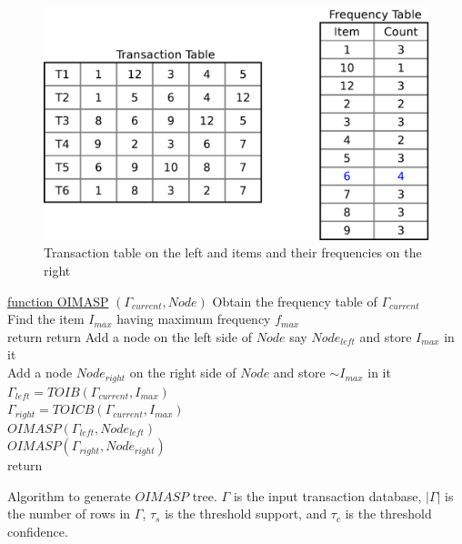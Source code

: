 \documentclass[review]{elsarticle}
\begin{document}
\begin{figure}
\begin{center}
\includegraphics[scale=0.3]{pdf/itemfreq}
\end{center}
\caption{Transaction table on the left and items and their frequencies on the right}
\label{Fig 5}
\end{figure}

\begin{algorithm}

    \underline{function OIMASP} $ (\Gamma_{current}, Node) $\;
    Obtain the frequency table of $ \Gamma_{current} $\\
    Find the item $ I_{max} $ having maximum frequency $ f_{max} $\\
      {
        return
      }     
      {
        return
      }
    Add a node on the left side of $ Node $ say $ Node_{left} $ and store $ I_{max} $ in it\\
    
    Add a node $ Node_{right} $ on the right side of $ Node $ and store  $ \sim I_{max} $ in it\\
    
    $ \Gamma_{left} = TOIB(\Gamma_{current}, I_{max}) $\\
    $ \Gamma_{right} = TOICB(\Gamma_{current}, I_{max}) $\\
    
    $ OIMASP(\Gamma_{left}, Node_{left}) $\\
    $ OIMASP(\Gamma_{right}, Node_{right}) $\\
    return
    \caption{Algorithm to generate $ OIMASP $ tree. $ \Gamma $ is the input transaction database, $ \vert \Gamma \vert $ is the number of rows in $ \Gamma $, $ \tau_{s} $ is the threshold support, and $ \tau_{c} $ is the threshold confidence.}
\end{algorithm}
\end{document}
